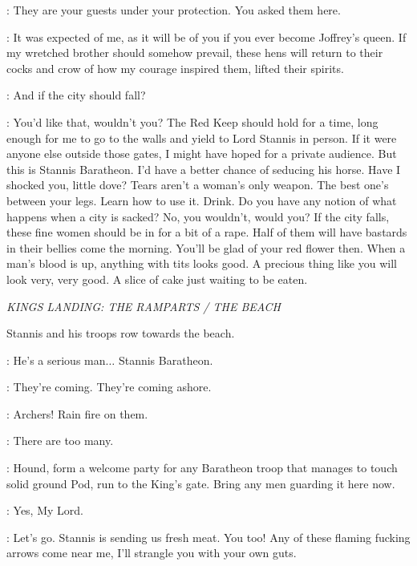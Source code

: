 \SANSA: They are your guests under your protection. You asked them here. 

\CERSEI: It was expected of me, as it will be of you if you ever become Joffrey's queen. If my wretched brother should somehow prevail, these hens will return to their cocks and crow of how my courage inspired them, lifted their spirits. 

\SANSA: And if the city should fall? 

\CERSEI: You'd like that, wouldn't you? The Red Keep should hold for a time, long enough for me to go to the walls and yield to Lord Stannis in person. If it were anyone else outside those gates, I might have hoped for a private audience. But this is Stannis Baratheon. I'd have a better chance of seducing his horse. Have I shocked you, little dove? Tears aren't a woman's only weapon. The best one's between your legs. Learn how to use it. Drink. Do you have any notion of what happens when a city is sacked? No, you wouldn't, would you? If the city falls, these fine women should be in for a bit of a rape. Half of them will have bastards in their bellies come the morning. You'll be glad of your red flower then. When a man's blood is up, anything with tits looks good. A precious thing like you will look very, very good. A slice of cake just waiting to be eaten. 

\scene

\textit{KINGS LANDING: THE RAMPARTS / THE BEACH}


\n Stannis and his troops row towards the beach.

\TYRION: He's a serious man$\ldots$ Stannis Baratheon. 

\JOFFREY: They're coming. They're coming ashore. 

\TYRION: Archers! Rain fire on them. 

\JOFFREY: There are too many. 

\TYRION: Hound, form a welcome party for any Baratheon troop that manages to touch solid ground  Pod, run to the King's gate. Bring any men guarding it here now. 

\PODRICK: Yes, My Lord. 

\HOUND: Let's go. Stannis is sending us fresh meat.  You too!  Any of these flaming fucking arrows come near me, I'll strangle you with your own guts. 


